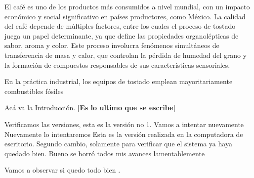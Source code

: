 El café es uno de los productos más consumidos a nivel mundial, con un impacto económico y social significativo en países productores, como México. La calidad del café depende de múltiples factores, entre los cuales el proceso de tostado juega un papel determinante, ya que define las propiedades organolépticas de sabor, aroma y color. Este proceso involucra fenómenos simultáneos de transferencia de masa y calor, que controlan la pérdida de humedad del grano y la formación de compuestos responsables de sus características sensoriales. \par
En la práctica industrial, los equipos de tostado emplean mayoritariamente combustibles fósiles 


Acá va la Introducción. \textbf{[Es lo ultimo que se escribe]}

Verificamos las versiones, esta es la versión no 1.
Vamos a intentar nuevamente
Nuevamente lo intentaremos 
Esta es la versión realizada en la computadora de escritorio.
Segundo cambio, solamente para verificar que el sistema ya haya quedado bien.
\clearpage 
Bueno se borró todos mis avances lamentablemente \par
Vamos a observar si quedo todo bien \parencite{Li2026}.
\par